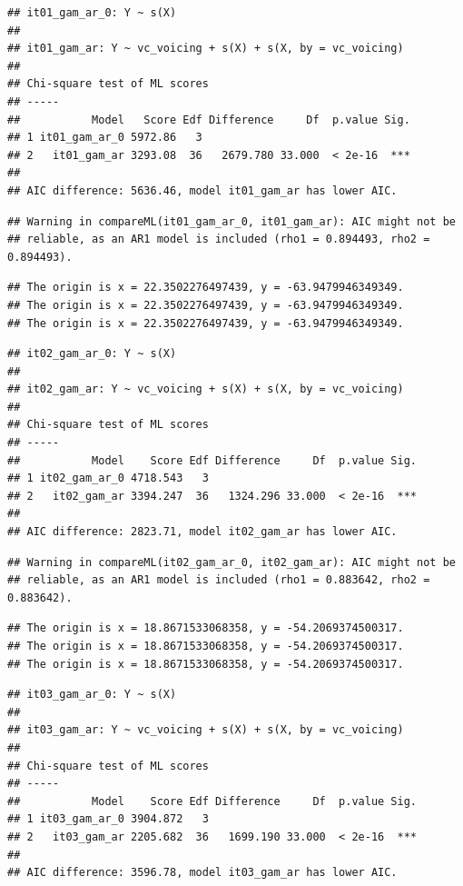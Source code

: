 \documentclass[12pt,]{article}
\begin{document}
\begin{verbatim}
## it01_gam_ar_0: Y ~ s(X)
## 
## it01_gam_ar: Y ~ vc_voicing + s(X) + s(X, by = vc_voicing)
## 
## Chi-square test of ML scores
## -----
##           Model   Score Edf Difference     Df  p.value Sig.
## 1 it01_gam_ar_0 5972.86   3                                
## 2   it01_gam_ar 3293.08  36   2679.780 33.000  < 2e-16  ***
## 
## AIC difference: 5636.46, model it01_gam_ar has lower AIC.
\end{verbatim}

\begin{verbatim}
## Warning in compareML(it01_gam_ar_0, it01_gam_ar): AIC might not be
## reliable, as an AR1 model is included (rho1 = 0.894493, rho2 = 0.894493).
\end{verbatim}

\begin{verbatim}
## The origin is x = 22.3502276497439, y = -63.9479946349349.
## The origin is x = 22.3502276497439, y = -63.9479946349349.
## The origin is x = 22.3502276497439, y = -63.9479946349349.
\end{verbatim}

\begin{verbatim}
## it02_gam_ar_0: Y ~ s(X)
## 
## it02_gam_ar: Y ~ vc_voicing + s(X) + s(X, by = vc_voicing)
## 
## Chi-square test of ML scores
## -----
##           Model    Score Edf Difference     Df  p.value Sig.
## 1 it02_gam_ar_0 4718.543   3                                
## 2   it02_gam_ar 3394.247  36   1324.296 33.000  < 2e-16  ***
## 
## AIC difference: 2823.71, model it02_gam_ar has lower AIC.
\end{verbatim}

\begin{verbatim}
## Warning in compareML(it02_gam_ar_0, it02_gam_ar): AIC might not be
## reliable, as an AR1 model is included (rho1 = 0.883642, rho2 = 0.883642).
\end{verbatim}

\begin{verbatim}
## The origin is x = 18.8671533068358, y = -54.2069374500317.
## The origin is x = 18.8671533068358, y = -54.2069374500317.
## The origin is x = 18.8671533068358, y = -54.2069374500317.
\end{verbatim}

\begin{verbatim}
## it03_gam_ar_0: Y ~ s(X)
## 
## it03_gam_ar: Y ~ vc_voicing + s(X) + s(X, by = vc_voicing)
## 
## Chi-square test of ML scores
## -----
##           Model    Score Edf Difference     Df  p.value Sig.
## 1 it03_gam_ar_0 3904.872   3                                
## 2   it03_gam_ar 2205.682  36   1699.190 33.000  < 2e-16  ***
## 
## AIC difference: 3596.78, model it03_gam_ar has lower AIC.
\end{verbatim}
\end{document}
